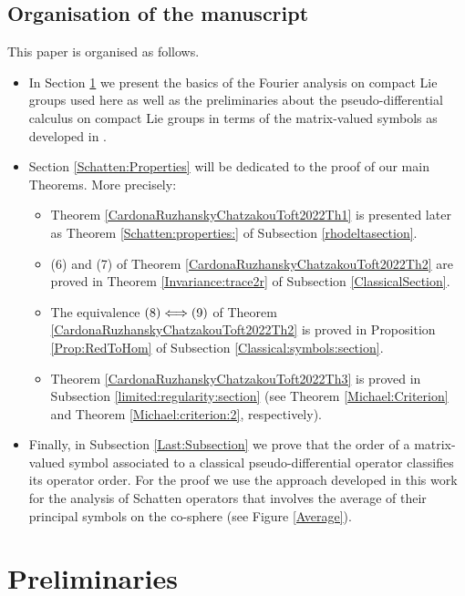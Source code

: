 \documentclass[12pt, reqno]{amsart}
\theoremstyle{definition}
\theoremstyle{remark}
\numberwithin{equation}{section}
\begin{document}
\subsection{Organisation of the manuscript}
This paper is organised as follows.
\begin{itemize}
    \item In Section \ref{Preliminaries} we present the basics of the Fourier analysis on compact Lie groups used here as well as the preliminaries about the pseudo-differential calculus on compact Lie groups in terms of the matrix-valued symbols as developed in \cite{Ruz}. 
    \item Section \ref{Schatten:Properties} will be dedicated to the proof of our main Theorems. More precisely:
\begin{itemize}
    \item[1.] Theorem \ref{CardonaRuzhanskyChatzakouToft2022Th1} is presented later  as Theorem \ref{Schatten:properties:}  of Subsection \ref{rhodeltasection}.
     \item[2.] (6) and (7) of Theorem \ref{CardonaRuzhanskyChatzakouToft2022Th2}  are  proved in Theorem \ref{Invariance:trace2r}  of Subsection \ref{ClassicalSection}.
     \item[3.] The equivalence $\textnormal{(8)}\Longleftrightarrow \textnormal{(9)} $ of   Theorem \ref{CardonaRuzhanskyChatzakouToft2022Th2} is proved in Proposition \ref{Prop:RedToHom} of Subsection \ref{Classical:symbols:section}.
     \item[4.]   Theorem \ref{CardonaRuzhanskyChatzakouToft2022Th3} is proved in Subsection \ref{limited:regularity:section} (see Theorem \ref{Michael:Criterion} and Theorem \ref{Michael:criterion:2}, respectively). 
\end{itemize}
\item Finally, in Subsection \ref{Last:Subsection} we prove that the order of a matrix-valued symbol associated to a classical pseudo-differential operator classifies its operator order. For the proof we use the approach developed in this work for the analysis of Schatten operators that involves the average of their principal symbols  on the co-sphere (see Figure \ref{Average}).
\end{itemize}



\section{Preliminaries}\label{Preliminaries}
\end{document}
